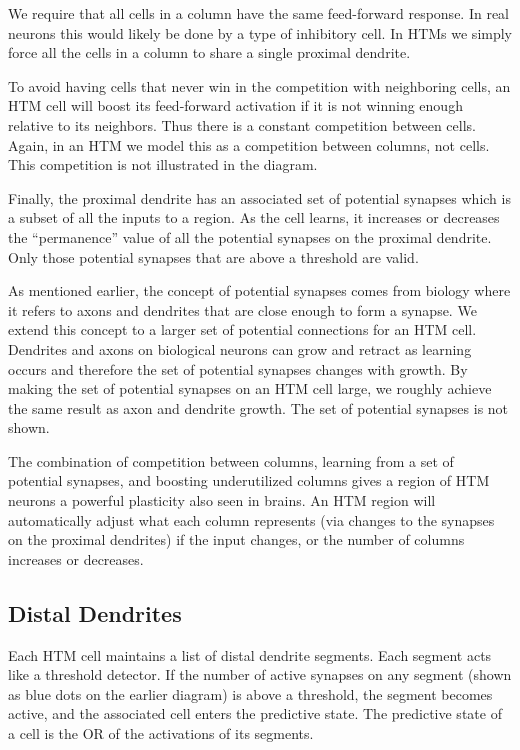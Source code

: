 We require that all cells in a column have the same feed-forward
response. In real neurons this would likely be done by a type of
inhibitory cell. In HTMs we simply force all the cells in a column to
share a single proximal dendrite.

To avoid having cells that never win in the competition with
neighboring cells, an HTM cell will boost its feed-forward activation
if it is not winning enough relative to its neighbors. Thus there is a
constant competition between cells. Again, in an HTM we model this as
a competition between columns, not cells. This competition is not
illustrated in the diagram.

Finally, the proximal dendrite has an associated set of potential
synapses which is a subset of all the inputs to a region. As the cell
learns, it increases or decreases the ``permanence'' value of all the
potential synapses on the proximal dendrite. Only those potential
synapses that are above a threshold are valid.

As mentioned earlier, the concept of potential synapses comes from
biology where it refers to axons and dendrites that are close enough
to form a synapse. We extend this concept to a larger set of potential
connections for an HTM cell. Dendrites and axons on biological neurons
can grow and retract as learning occurs and therefore the set of
potential synapses changes with growth. By making the set of potential
synapses on an HTM cell large, we roughly achieve the same result as
axon and dendrite growth. The set of potential synapses is not shown.

The combination of competition between columns, learning from a set of
potential synapses, and boosting underutilized columns gives a region
of HTM neurons a powerful plasticity also seen in brains. An HTM
region will automatically adjust what each column represents (via
changes to the synapses on the proximal dendrites) if the input
changes, or the number of columns increases or decreases.

\subsection*{Distal Dendrites}
Each HTM cell maintains a list of distal dendrite segments. Each
segment acts like a threshold detector. If the number of active
synapses on any segment (shown as blue dots on the earlier diagram) is
above a threshold, the segment becomes active, and the associated cell
enters the predictive state. The predictive state of a cell is the OR
of the activations of its segments.

